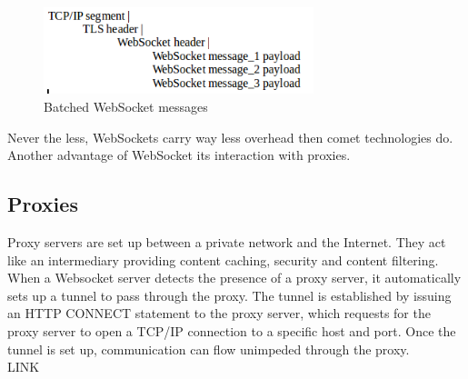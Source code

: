 \vspace{10 mm}

\begin{figure}[H]
\centering
\includegraphics[width=0.7\textwidth]{./Figures/batched_websocket.png}
\caption[Batched WebSocket messages]{Batched WebSocket messages \citep{Reference30}}
\label{fig:batched_websocket}
\end{figure}

Never the less, WebSockets carry way less overhead then comet technologies do.
Another advantage of WebSocket its interaction with proxies.\\

\subsection{Proxies}

Proxy servers are set up between a private network and the Internet. They act
like an intermediary providing content caching, security and content
filtering.\\

When a Websocket server detects the presence of a proxy server, it
automatically sets up a tunnel to pass through the proxy. The tunnel is
established by issuing an HTTP CONNECT statement to the proxy server, which
requests for the proxy server to open a TCP/IP connection to a specific host
and port. Once the tunnel is set up, communication can flow unimpeded through
the proxy.\\

LINK

